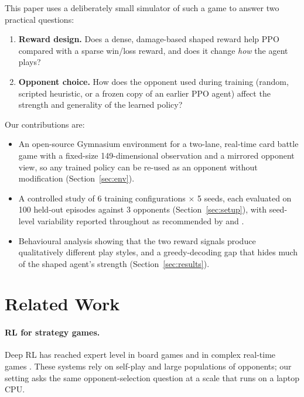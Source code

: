 \documentclass[11pt]{article}
\begin{document}
This paper uses a deliberately small simulator of such a game to answer two
practical questions:

\begin{enumerate}
  \item \textbf{Reward design.} Does a dense, damage-based shaped reward help
  PPO compared with a sparse win/loss reward, and does it change
  \emph{how} the agent plays?
  \item \textbf{Opponent choice.} How does the opponent used during training
  (random, scripted heuristic, or a frozen copy of an earlier PPO agent)
  affect the strength and generality of the learned policy?
\end{enumerate}

Our contributions are:
\begin{itemize}
  \item An open-source Gymnasium \citep{towers2024gymnasium} environment for a
  two-lane, real-time card battle game with a fixed-size 149-dimensional
  observation and a mirrored opponent view, so any trained policy can be
  re-used as an opponent without modification (Section~\ref{sec:env}).
  \item A controlled study of 6 training configurations $\times$ 5 seeds,
  each evaluated on 100 held-out episodes against 3 opponents
  (Section~\ref{sec:setup}), with seed-level variability reported throughout
  as recommended by \citet{henderson2018matters} and
  \citet{agarwal2021precipice}.
  \item Behavioural analysis showing that the two reward signals produce
  qualitatively different play styles, and a greedy-decoding gap that hides
  much of the shaped agent's strength (Section~\ref{sec:results}).
\end{itemize}

\section{Related Work}

\paragraph{RL for strategy games.}
Deep RL has reached expert level in board games \citep{silver2016alphago} and
in complex real-time games \citep{vinyals2019alphastar, berner2019dota}. These
systems rely on self-play and large populations of opponents; our setting asks
the same opponent-selection question at a scale that runs on a laptop CPU.
\end{document}
